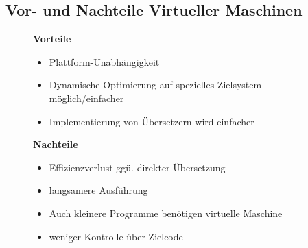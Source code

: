 \documentclass[12pt]{report}
\begin{document}
\subsection{Vor- und Nachteile Virtueller Maschinen}
\begin{figure}[H]
  \begin{minipage}[t]{0.45\textwidth}
    \begin{center}
      \textbf{Vorteile}
    \end{center}
    \begin{itemize}
      \item Plattform-Unabhängigkeit
      \item Dynamische Optimierung auf spezielles Zielsystem möglich/einfacher
      \item Implementierung von Übersetzern wird einfacher
    \end{itemize}
  \end{minipage}
  \hfill
  \begin{minipage}[t]{0.45\textwidth}
    \begin{center}
      \textbf{Nachteile}
    \end{center}
    \begin{itemize}
      \item Effizienzverlust ggü. direkter Übersetzung
      \item langsamere Ausführung
      \item Auch kleinere Programme benötigen virtuelle Maschine
      \item weniger Kontrolle über Zielcode
    \end{itemize}
  \end{minipage}
\end{figure}
\end{document}

